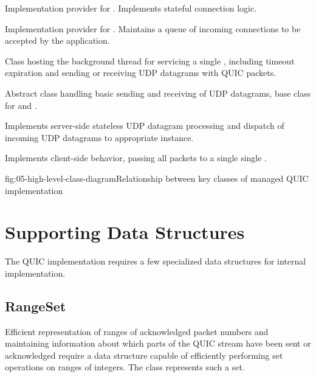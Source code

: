 \begin{itemize}

  \litem[]{\ManagedQuicConnection{}} Implementation provider for \QuicConnection{}. Implements
stateful connection logic.

  \litem[]{\ManagedQuicListener{}} Implementation provider for \QuicListener{}. Maintains a queue of
incoming connections to be accepted by the application.

  \litem[]{\QuicConnectionContext{}} Class hosting the background thread for servicing a single
\ManagedQuicConnection{}, including timeout expiration and sending or receiving UDP datagrams with
QUIC packets.

  \litem[]{\QuicSocketContext{}} Abstract class handling basic sending and receiving of UDP
datagrams, base class for \QuicClientSocketContext{} and \QuicServerSocketContext{}.

  \litem[]{\QuicServerSocketContext{}} Implements server-side stateless UDP datagram processing and
dispatch of incoming UDP datagrams to appropriate \QuicConnectionContext{} instance.

  \litem[]{\QuicClientSocketContext{}} Implements client-side \QuicSocketContext{} behavior, passing
all packets to a single single \QuicConnectionContext{}.

\end{itemize}

\begin{myFigure}{fig:05-high-level-class-diagram}{Relationship between key classes of managed QUIC
implementation}

\resizebox{\linewidth}{!}{}

\end{myFigure}

\section{Supporting Data Structures}

The QUIC implementation requires a few specialized data structures for internal implementation.

\subsection{RangeSet}

Efficient representation of ranges of acknowledged packet numbers and maintaining information about
which parts of the QUIC stream have been sent or acknowledged require a data structure capable of
efficiently performing set operations on ranges of integers. The \RangeSet{} class represents such a
set.

